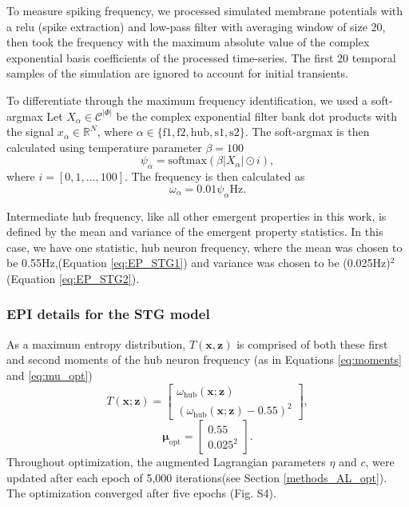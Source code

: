 \documentclass[11pt]{article}
\begin{document}
To measure spiking frequency, we processed simulated membrane potentials with a relu (spike extraction) and low-pass filter with averaging window of size 20, then took the frequency with the maximum absolute value of the complex exponential basis coefficients of the processed time-series.  The first 20 temporal samples of the simulation are ignored to account for initial transients.

To differentiate through the maximum frequency identification, we used a soft-argmax
Let $X_\alpha \in \mathcal{C}^{|\Phi|}$ be the complex exponential filter bank dot products with the signal $x_\alpha \in \mathbb{R}^{N}$, where $\alpha \in \{ \text{f1}, \text{f2}, \text{hub}, \text{s1}, \text{s2} \}$.  
The soft-argmax is then calculated using temperature parameter $\beta=100$
\begin{equation}
\psi_\alpha = \text{softmax}(\beta|X_\alpha|\odot i),
\end{equation}
where $i = [0, 1, ..., 100]$.
The frequency is then calculated as 
\begin{equation}
\omega_\alpha = 0.01\psi_\alpha \text{Hz}.
\end{equation}

Intermediate hub frequency, like all other emergent properties in this work, is defined by the mean and variance of the emergent property statistics.
In this case, we have one statistic, hub neuron frequency, where the mean was chosen to be 0.55Hz,(Equation \ref{eq:EP_STG1}) and variance was chosen to be (0.025Hz)$^2$ (Equation \ref{eq:EP_STG2}).

\subsubsection{EPI details for the STG model} \label{methods_stg_epi}
As a maximum entropy distribution, $T(\mathbf{x}, \mathbf{z})$ is comprised of both these first and second moments of the hub neuron frequency (as in Equations \ref{eq:moments} and \ref{eq:mu_opt})
\begin{equation} 
T(\mathbf{x}; \mathbf{z}) = \begin{bmatrix} \omega_{\text{hub}}(\mathbf{x}; \mathbf{z}) \\ \left( \omega_{\text{hub}}(\mathbf{x}; \mathbf{z}) - 0.55 \right)^2 \end{bmatrix},
\end{equation}
\begin{equation} 
\bm{\mu}_{\text{opt}} = \begin{bmatrix} 0.55 \\ 0.025^2 \end{bmatrix}.
\end{equation}
Throughout optimization, the augmented Lagrangian parameters $\eta$ and $c$, were updated after each epoch of 5,000 iterations(see Section \ref{methods_AL_opt}).  
The optimization converged after five epochs (Fig. S4).
\end{document}
